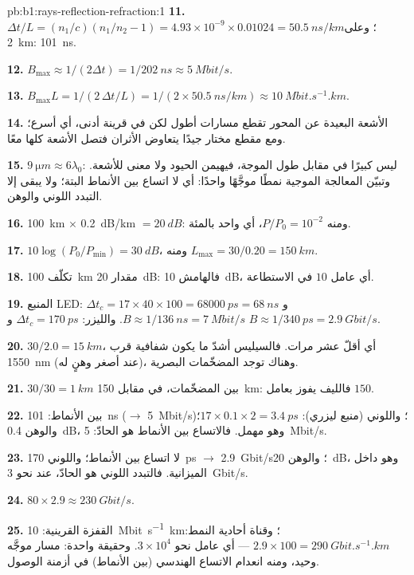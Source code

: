 \begin{solution}{pb:b1:rays-reflection-refraction:1}
\textbf{11.} $\Delta t/L = (n_1/c)(n_1/n_2 - 1) = 4.93\times10^{-9} \times
0.01024 = \qty{50.5}{ns/km}$؛ وعلى \qty{2}{km}: \qty{101}{ns}.

\textbf{12.} $B_{\max} \approx 1/(2\Delta t) = 1/\qty{202}{ns} \approx
\qty{5}{Mbit/s}$.

\textbf{13.} $B_{\max} L = 1/(2\,\Delta t/L) = 1/(2 \times
\qty{50.5}{ns/km}) \approx \qty{10}{Mbit.s^{-1}.km}$.

\textbf{14.} الأشعة البعيدة عن المحور تقطع مسارات أطول لكن في قرينة
أدنى، أي أسرع؛ ومع مقطع مختار جيدًا يتعاوض الأثران
فتصل الأشعة كلها معًا.

\textbf{15.} $\qty{9}{\micro m} \approx 6\lambda_0$:  ليس
كبيرًا في مقابل طول الموجة، فيهيمن الحيود ولا معنى للأشعة.
وتبيّن المعالجة الموجية نمطًا موجَّهًا واحدًا: أي لا اتساع
بين الأنماط البتة؛ ولا يبقى إلا التبدد اللوني والوهن.

\textbf{16.} \qty{100}{km} $\times$ \qty{0.2}{dB/km} $= \qty{20}{dB}$:
ومنه $P/P_0 = 10^{-2}$، أي واحد بالمئة.

\textbf{17.} $10\log(P_0/P_{\min}) = \qty{30}{dB}$، ومنه $L_{\max} =
30/0.20 = \qty{150}{km}$.

\textbf{18.} تكلّف \qty{100}{km} مقدار \qty{20}{dB}: فالهامش \qty{10}{dB}، أي
عامل $10$ في الاستطاعة.

\textbf{19.} المنبع LED: $\Delta t_c = 17 \times 40 \times 100 = \qty{68000}{ps}
= \qty{68}{ns}$ و $B \approx 1/\qty{136}{ns} = \qty{7}{Mbit/s}$. والليزر:
$\Delta t_c = \qty{170}{ps}$ و $B \approx 1/\qty{340}{ps} =
\qty{2.9}{Gbit/s}$.

\textbf{20.} $30/2.0 = \qty{15}{km}$، أي أقلّ عشر مرات. فالسيليس أشدّ ما
يكون شفافية قرب \qty{1550}{nm} (عند أصغر وهنٍ له)، وهناك توجد
المضخّمات البصرية.

\textbf{21.} $30/30 = \qty{1}{km}$ بين المضخّمات، في مقابل
\qty{150}{km}: فالليف يفوز بعامل $150$.

\textbf{22.} بين الأنماط: \qty{101}{ns} ($\to$ \qty{5}{Mbit/s})؛
واللوني (منبع ليزري): $17 \times 0.1 \times 2 = \qty{3.4}{ps}$؛
والوهن \qty{0.4}{dB}، وهو مهمل. فالاتساع بين الأنماط هو الحادّ:
\qty{5}{Mbit/s}.

\textbf{23.} لا اتساع بين الأنماط؛ واللوني \qty{170}{ps} $\to$
\qty{2.9}{Gbit/s}؛ والوهن \qty{20}{dB}، وهو داخل الميزانية. فالتبدد
اللوني هو الحادّ، عند نحو \qty{3}{Gbit/s}.

\textbf{24.} $80 \times 2.9 \approx \qty{230}{Gbit/s}$.

\textbf{25.} القفزة القرينية: \qty{10}{Mbit.s^{-1}.km}؛ وقناة أحادية النمط:
$2.9 \times 100 = \qty{290}{Gbit.s^{-1}.km}$ --- أي عامل نحو
$3\times10^4$. وحقيقة واحدة: مسار موجَّه وحيد، ومنه انعدام الاتساع
الهندسي (بين الأنماط) في أزمنة الوصول.
\end{solution}
